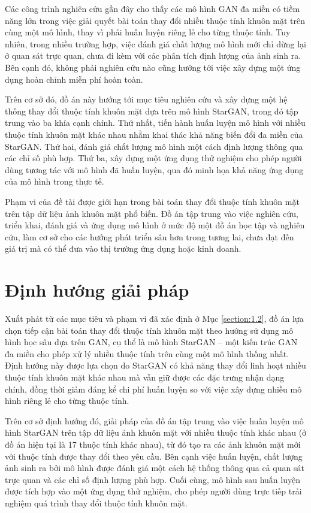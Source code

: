 \documentclass[../DoAn.tex]{subfiles}
\begin{document}
Các công trình nghiên cứu gần đây cho thấy các mô hình GAN đa miền có tiềm năng lớn trong việc giải quyết bài toán thay đổi nhiều thuộc tính khuôn mặt trên cùng một mô hình, thay vì phải huấn luyện riêng lẻ cho từng thuộc tính. Tuy nhiên, trong nhiều trường hợp, việc đánh giá chất lượng mô hình mới chỉ dừng lại ở quan sát trực quan, chưa đi kèm với các phân tích định lượng của ảnh sinh ra. Bên cạnh đó, không phải nghiên cứu nào cũng hướng tới việc xây dựng một ứng dụng hoàn chỉnh miễn phí hoàn toàn.

Trên cơ sở đó, đồ án này hướng tới mục tiêu nghiên cứu và xây dựng một hệ thống thay đổi thuộc tính khuôn mặt dựa trên mô hình StarGAN, trong đó tập trung vào ba khía cạnh chính. Thứ nhất, tiến hành huấn luyện mô hình với nhiều thuộc tính khuôn mặt khác nhau nhằm khai thác khả năng biến đổi đa miền của StarGAN. Thứ hai, đánh giá chất lượng mô hình một cách định lượng thông qua các chỉ số phù hợp. Thứ ba, xây dựng một ứng dụng thử nghiệm cho phép người dùng tương tác với mô hình đã huấn luyện, qua đó minh họa khả năng ứng dụng của mô hình trong thực tế.

Phạm vi của đề tài được giới hạn trong bài toán thay đổi thuộc tính khuôn mặt trên tập dữ liệu ảnh khuôn mặt phổ biến. Đồ án tập trung vào việc nghiên cứu, triển khai, đánh giá và ứng dụng mô hình ở mức độ một đồ án học tập và nghiên cứu, làm cơ sở cho các hướng phát triển sâu hơn trong tương lai, chưa đạt đến giá trị mà có thể đưa vào thị trường ứng dụng hoặc kinh doanh.

\section{Định hướng giải pháp}
\label{section:1.3}
Xuất phát từ các mục tiêu và phạm vi đã xác định ở Mục \ref{section:1.2}, đồ án lựa chọn tiếp cận bài toán thay đổi thuộc tính khuôn mặt theo hướng sử dụng mô hình học sâu dựa trên GAN, cụ thể là mô hình StarGAN – một kiến trúc GAN đa miền cho phép xử lý nhiều thuộc tính trên cùng một mô hình thống nhất. Định hướng này được lựa chọn do StarGAN có khả năng thay đổi linh hoạt nhiều thuộc tính khuôn mặt khác nhau mà vẫn giữ được các đặc trưng nhận dạng chính, đồng thời giảm đáng kể chi phí huấn luyện so với việc xây dựng nhiều mô hình riêng lẻ cho từng thuộc tính.

Trên cơ sở định hướng đó, giải pháp của đồ án tập trung vào việc huấn luyện mô hình StarGAN trên tập dữ liệu ảnh khuôn mặt với nhiều thuộc tính khác nhau (ở đồ án hiện tại là 17 thuộc tính khác nhau), từ đó tạo ra các ảnh khuôn mặt mới với thuộc tính được thay đổi theo yêu cầu. Bên cạnh việc huấn luyện, chất lượng ảnh sinh ra bởi mô hình được đánh giá một cách hệ thống thông qua cả quan sát trực quan và các chỉ số định lượng phù hợp. Cuối cùng, mô hình sau huấn luyện được tích hợp vào một ứng dụng thử nghiệm, cho phép người dùng trực tiếp trải nghiệm quá trình thay đổi thuộc tính khuôn mặt.
\end{document}
